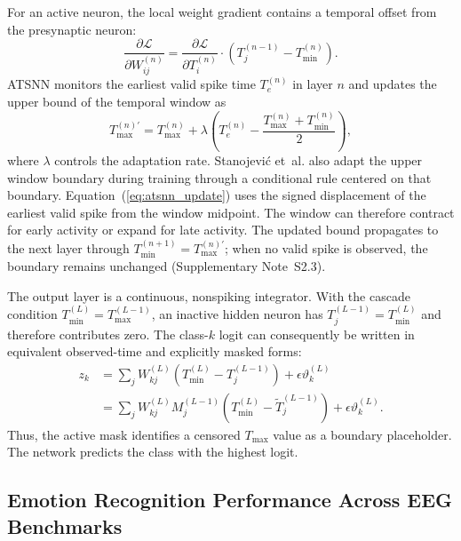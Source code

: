 ﻿\documentclass{nsr}
\begin{document}
For an active neuron, the local weight gradient contains a temporal offset from the presynaptic neuron:
\begin{equation}
\frac{\partial \mathcal{L}}{\partial W_{ij}^{(n)}} = \frac{\partial \mathcal{L}}{\partial T_i^{(n)}} \cdot \left(T_j^{(n-1)} - T_{\min}^{(n)}\right).
\label{eq:grad_w}
\end{equation}
ATSNN monitors the earliest valid spike time $T_{e}^{(n)}$ in layer $n$ and updates the upper bound of the temporal window as
\begin{equation}
T_{\max}^{(n)\prime} = T_{\max}^{(n)} + \lambda\!\left(T_{e}^{(n)} - \frac{T_{\max}^{(n)} + T_{\min}^{(n)}}{2}\right),
\label{eq:atsnn_update}
\end{equation}
where $\lambda$ controls the adaptation rate. Stanojevi\'{c} et~al. also adapt the upper window boundary during training through a conditional rule centered on that boundary. Equation~(\ref{eq:atsnn_update}) uses the signed displacement of the earliest valid spike from the window midpoint. The window can therefore contract for early activity or expand for late activity. The updated bound propagates to the next layer through $T_{\min}^{(n+1)}=T_{\max}^{(n)\prime}$; when no valid spike is observed, the boundary remains unchanged (Supplementary Note~S2.3).

The output layer is a continuous, nonspiking integrator. With the cascade condition $T_{\min}^{(L)}=T_{\max}^{(L-1)}$, an inactive hidden neuron has $T_j^{(L-1)}=T_{\min}^{(L)}$ and therefore contributes zero. The class-$k$ logit can consequently be written in equivalent observed-time and explicitly masked forms:
\begin{equation}
\begin{aligned}
z_k
&= \sum\nolimits_j W_{kj}^{(L)}\!\left(T_{\min}^{(L)} - T_j^{(L-1)}\right) + \epsilon \vartheta_k^{(L)} \\
&= \sum\nolimits_j W_{kj}^{(L)} M_j^{(L-1)}\!\left(T_{\min}^{(L)} - \tilde{T}_j^{(L-1)}\right) + \epsilon \vartheta_k^{(L)}.
\end{aligned}
\label{eq:out_logit}
\end{equation}
Thus, the active mask identifies a censored $T_{\max}$ value as a boundary placeholder. The network predicts the class with the highest logit.


\subsection{Emotion Recognition Performance Across EEG Benchmarks}
\end{document}

